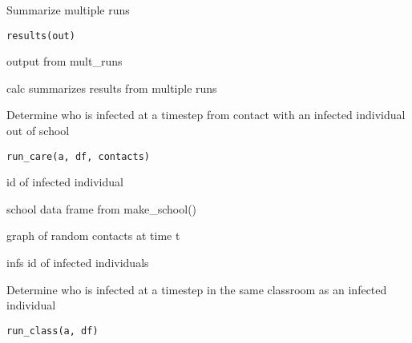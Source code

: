 \documentclass[a4paper]{book}
\begin{document}
%
\begin{Description}\relax
Summarize multiple runs
\end{Description}
%
\begin{Usage}
\begin{verbatim}
results(out)
\end{verbatim}
\end{Usage}
%
\begin{Arguments}
\begin{ldescription}
\item[\code{out}] output from mult\_runs
\end{ldescription}
\end{Arguments}
%
\begin{Value}
calc summarizes results from multiple runs
\end{Value}
%
\begin{Description}\relax
Determine who is infected at a timestep
from contact with an infected individual out of school
\end{Description}
%
\begin{Usage}
\begin{verbatim}
run_care(a, df, contacts)
\end{verbatim}
\end{Usage}
%
\begin{Arguments}
\begin{ldescription}
\item[\code{a}] id of infected individual

\item[\code{df}] school data frame from make\_school()

\item[\code{contacts}] graph of random contacts at time t
\end{ldescription}
\end{Arguments}
%
\begin{Value}
infs id of infected individuals
\end{Value}
%
\begin{Description}\relax
Determine who is infected at a timestep
in the same classroom as an infected individual
\end{Description}
%
\begin{Usage}
\begin{verbatim}
run_class(a, df)
\end{verbatim}
\end{Usage}
\end{document}
